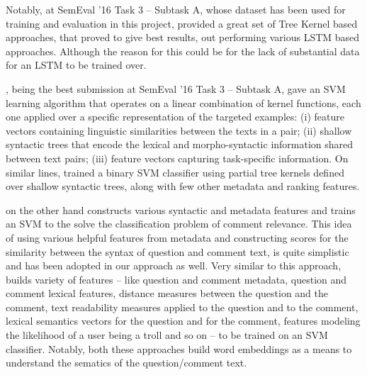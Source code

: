 \documentclass[12pt, a4paper, oneside]{Thesis} %
\begin{document}


Notably, at SemEval '16 Task 3 -- Subtask A, whose dataset has been used for training and evaluation in this project, provided a great set of Tree Kernel based approaches, that proved to give best results, out performing various LSTM based approaches. Although the reason for this could be for the lack of substantial data for an LSTM to be trained over.

\cite{filice2016kelp}, being the best submission at SemEval '16 Task 3 -- Subtask A, gave an SVM learning algorithm that operates on a linear combination of kernel functions, each one applied over a specific representation of the targeted examples: (i) feature vectors containing linguistic similarities between the texts in a pair; (ii) shallow syntactic trees that encode the lexical and morpho-syntactic information shared between text pairs; (iii) feature vectors capturing task-specific information. On similar lines, \cite{joty2016convkn} trained a binary SVM classifier using partial tree kernels defined over shallow syntactic trees, along with few other metadata and ranking features.

\cite{mihaylov2016semanticz} on the other hand constructs various syntactic and metadata features and trains an SVM to the solve the classification problem of comment relevance. This idea of using various helpful features from metadata and constructing scores for the similarity between the syntax of question and comment text, is quite simplistic and has been adopted in our approach as well. Very similar to this approach, \cite{mihaylova2016super} builds variety of features -- like question and comment metadata, question and comment lexical features, distance measures between the question and the comment, text readability measures applied to the question and to the comment, lexical semantics vectors for the question and for the comment, features modeling the likelihood of a user being a troll and so on -- to be trained on an SVM classifier. Notably, both these approaches build word embeddings as a means to understand the sematics of the question/comment text.
\end{document}
